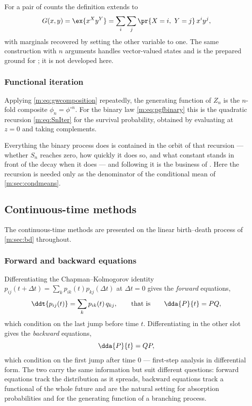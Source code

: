 For a pair of counts the definition extends to
\begin{equation}
\label{m:eq:pgfbivariate}
G(x,y) = \ex{x^Xy^Y} = \sum_i\sum_j\pr{X=i,\ Y=j}\,x^iy^j ,
\end{equation}
with marginals recovered by setting the other variable to one. The same
construction with $n$ arguments handles vector-valued states and is the prepared
ground for ; it is not
developed here.

\subsubsection{Functional iteration}
\label{m:sec:iteration}

Applying \cref{m:eq:gwcomposition} repeatedly, the generating function of $Z_n$ is
the $n$-fold composite $\phi_n=\phi^{\circ n}$. For the binary law
\cref{m:eq:pgfbinary} this is the quadratic recursion \cref{m:eq:SnIter} for the
survival probability, obtained by evaluating at $z=0$ and taking complements.

Everything the binary process does is contained in the orbit of that recursion
--- whether $S_n$ reaches zero, how quickly it does so, and what constant stands
in front of the decay when it does --- and following it is the business of \ChA.
Here the recursion is needed only as the denominator of the conditional mean of
\cref{m:sec:condmeans}.

\subsection{Continuous-time methods}
\label{m:sec:ctmethods}

The continuous-time methods are presented on the linear birth--death process of
\cref{m:sec:bd} throughout.

\subsubsection{Forward and backward equations}
\label{m:sec:backward}

Differentiating the Chapman--Kolmogorov identity
$p_{ij}(t+\Delta t)=\sum_kp_{ik}(t)p_{kj}(\Delta t)$ at $\Delta t=0$ gives the
\emph{forward} equations,
\begin{equation}
\label{m:eq:forward}
\ddt{p_{ij}(t)} = \sum_kp_{ik}(t)\,q_{kj},
\qquad\text{that is}\qquad
\dda{P}{t} = PQ ,
\end{equation}
which condition on the last jump before time $t$. Differentiating in the other slot
gives the \emph{backward} equations,
\begin{equation}
\label{m:eq:backwardeq}
\dda{P}{t} = QP ,
\end{equation}
which condition on the first jump after time $0$ --- first-step analysis in
differential form. The two carry the same information but suit different questions:
forward equations track the distribution as it spreads, backward equations track a
functional of the whole future and are the natural setting for absorption
probabilities and for the generating function of a branching process.


